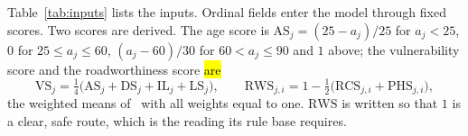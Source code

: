 \documentclass[systems,article,accept,moreauthors,pdftex]{Definitions/mdpi}
\begin{document}
Table~\ref{tab:inputs} lists the inputs. Ordinal fields enter the model through fixed scores.
\linebreak  Two scores are derived. The age score is $\mathrm{AS}_j=(25-a_j)/25$ for $a_j<25$, $0$ for
$25\le a_j\le 60$, $(a_j-60)/30$ for $60<a_j\le 90$ and $1$ above; the vulnerability score and
the roadworthiness score \hl{are} %
\begin{equation}\label{eq:vs-rws}
\mathrm{VS}_j=\tfrac14\bigl(\mathrm{AS}_j+\mathrm{DS}_j+\mathrm{IL}_j+\mathrm{LS}_j\bigr),
\qquad
\mathrm{RWS}_{j,i}=1-\tfrac12\bigl(\mathrm{RCS}_{j,i}+\mathrm{PHS}_{j,i}\bigr),
\end{equation}
the weighted means of~\cite{rabiei2026resilient} with all weights equal to one. $\mathrm{RWS}$
is written so that $1$ is a clear, safe route, which is the reading its rule base requires.
\end{document}
